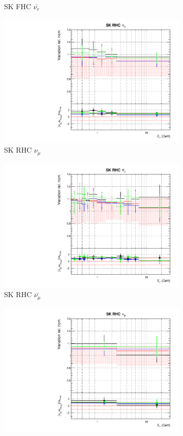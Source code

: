 \begin{figure}[t]
\begin{subfigure}{0.45\textwidth}
  \caption{SK FHC $\bar{\nu_{e}}$}
\end{subfigure}
\begin{subfigure}{0.45\textwidth}
  \centering
  \includegraphics[width=0.75\linewidth]{figs/detcovbinflux_12}
  \caption{SK RHC $\nu_{\mu}$}
\end{subfigure}
\begin{subfigure}{0.45\textwidth}
  \centering
  \includegraphics[width=0.75\linewidth]{figs/detcovbinflux_13}
  \caption{SK RHC $\bar{\nu_{\mu}}$}
\end{subfigure}
\begin{subfigure}{0.45\textwidth}
  \centering
  \includegraphics[width=0.75\linewidth]{figs/detcovbinflux_14}

\end{subfigure}
\end{figure}
